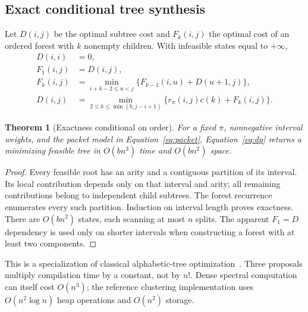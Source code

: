 \documentclass[11pt]{article}
\newtheorem{theorem}{Theorem}\newtheorem{proposition}[theorem]{Proposition}\newtheorem{lemma}[theorem]{Lemma}
\theoremstyle{definition}\newtheorem{definition}[theorem]{Definition}
\begin{document}
\subsection{Exact conditional tree synthesis}
Let $D(i,j)$ be the optimal subtree cost and $F_k(i,j)$ the optimal cost of an ordered forest with $k$ nonempty children. With infeasible states equal to $+\infty$,
\begin{align}
 D(i,i)&=0,\\
 F_1(i,j)&=D(i,j),\\
 F_k(i,j)&=\min_{i+k-2\le u<j}\{F_{k-1}(i,u)+D(u+1,j)\},\\
 D(i,j)&=\min_{2\le k\le\min(b,j-i+1)}\{r_\pi(i,j)c(k)+F_k(i,j)\}.\label{eq:dp}
\end{align}
\begin{theorem}[Exactness conditional on order]\label{thm:exact}
For a fixed $\pi$, nonnegative interval weights, and the packet model in Equation~\eqref{eq:packet}, Equation~\eqref{eq:dp} returns a minimizing feasible tree in $O(bn^3)$ time and $O(bn^2)$ space.
\end{theorem}
\begin{proof}
Every feasible root has an arity and a contiguous partition of its interval. Its local contribution depends only on that interval and arity; all remaining contributions belong to independent child subtrees. The forest recurrence enumerates every such partition. Induction on interval length proves exactness. There are $O(bn^2)$ states, each scanning at most $n$ splits. The apparent $F_1=D$ dependency is used only on shorter intervals when constructing a forest with at least two components.\end{proof}
This is a specialization of classical alphabetic-tree optimization~\cite{alphabetic}. Three proposals multiply compilation time by a constant, not by $n!$. Dense spectral computation can itself cost $O(n^3)$; the reference clustering implementation uses $O(n^2\log n)$ heap operations and $O(n^2)$ storage.
\end{document}
